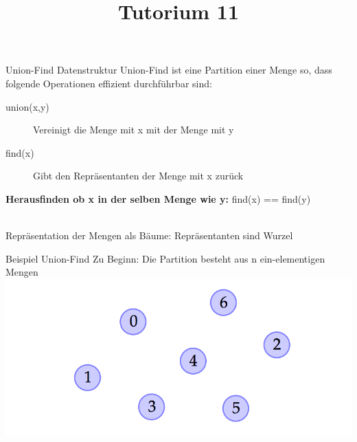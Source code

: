 
\title[Algorithmen I SS 14]{Tutorium 11}

\usepackage{alltt}




\begin{frame}
  \maketitle
\end{frame}


\begin{frame}{Union-Find Datenstruktur}
	Union-Find ist eine Partition einer Menge so, dass folgende Operationen effizient durchführbar sind:
	\begin{description}
		\item[union(x,y)] Vereinigt die Menge mit x mit der Menge mit y 
		\item[find(x)] Gibt den Repräsentanten der Menge mit x zurück
	\end{description}

	\textbf{Herausfinden ob x in der selben Menge wie y:} find(x) == find(y)

	\ \\
	Repräsentation der Mengen als Bäume: Repräsentanten sind Wurzel
\end{frame}

\begin{frame}{Beispiel Union-Find}
	Zu Beginn: Die Partition besteht aus n ein-elementigen Mengen
	\includegraphics[width=\textwidth]{images/uf01}
	
\end{frame}


